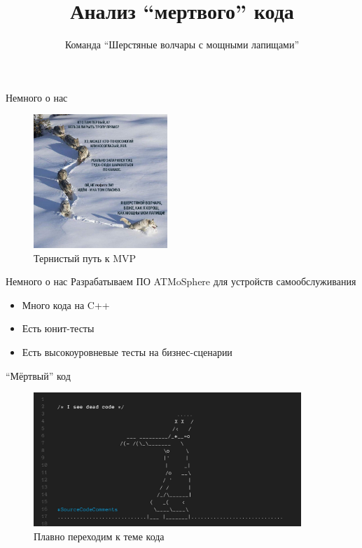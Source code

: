 \documentclass[aspectratio=169]{beamer}
\title{Анализ ``мертвого'' кода}
\author{Команда ``Шерстяные волчары с мощными лапищами''}
\newcommand{\myskip}{\vspace{\baselineskip}}
\begin{document}
\begin{frame}
    \titlepage
\end{frame}

\begin{frame}{Немного о нас}
    \begin{figure}
        \includegraphics[width=0.45\textwidth]{memes/volf.jpg}
        \caption{Тернистый путь к MVP}
    \end{figure}
\end{frame}

\begin{frame}{Немного о нас}
    Разрабатываем ПО ATMoSphere для устройств самообслуживания
    \begin{itemize}
        \item Много кода на C++
        \item Есть юнит-тесты
        \item Есть высокоуровневые тесты на бизнес-сценарии
    \end{itemize}
    \myskip
\end{frame}

\begin{frame}{``Мёртвый'' код}
    \begin{figure}
        \includegraphics[width=0.9\textwidth]{memes/dead_code.jpg}
        \caption{Плавно переходим к теме кода}
    \end{figure}
\end{frame}
\end{document}
